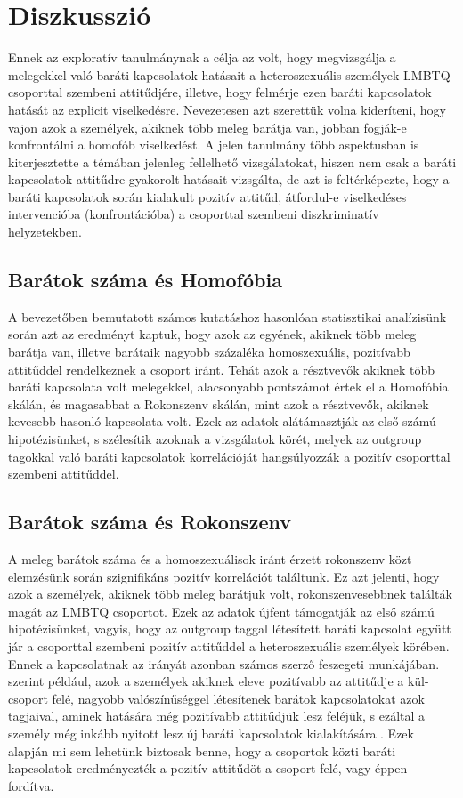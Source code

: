 \section{Diszkusszió}
Ennek az exploratív tanulmánynak a célja az volt, hogy megvizsgálja a melegekkel való baráti kapcsolatok hatásait a heteroszexuális személyek LMBTQ csoporttal szembeni attitűdjére, illetve, hogy felmérje ezen baráti kapcsolatok hatását az explicit viselkedésre. Nevezetesen azt szerettük volna kideríteni, hogy vajon azok a személyek, akiknek több meleg barátja van, jobban fogják-e konfrontálni a homofób viselkedést. A jelen tanulmány több aspektusban is kiterjesztette a témában jelenleg fellelhető vizsgálatokat, hiszen nem csak a baráti kapcsolatok attitűdre gyakorolt hatásait vizsgálta, de azt is feltérképezte, hogy a baráti kapcsolatok során kialakult pozitív attitűd, átfordul-e viselkedéses intervencióba (konfrontációba) a csoporttal szembeni diszkriminatív helyzetekben.

\subsection{Barátok száma és Homofóbia}
A bevezetőben bemutatott számos kutatáshoz hasonlóan \parencite{dasgupta_rivera_2008,pettigrew_1997}  statisztikai analízisünk során azt az eredményt kaptuk, hogy azok az egyének, akiknek több meleg barátja van, illetve barátaik nagyobb százaléka homoszexuális, pozitívabb attitűddel rendelkeznek a csoport iránt.  Tehát azok a résztvevők akiknek több baráti kapcsolata volt melegekkel, alacsonyabb pontszámot értek el a Homofóbia skálán, és magasabbat a Rokonszenv skálán, mint azok a résztvevők, akiknek kevesebb hasonló kapcsolata volt. Ezek az adatok alátá\-masztják az első számú hipotézisünket, s szélesítik azoknak a vizsgálatok körét, melyek az outgroup tagokkal való baráti kapcsolatok korrelációját hangsúlyozzák a pozitív csoporttal szembeni attitűddel. 

\subsection{Barátok száma és Rokonszenv}
A meleg barátok száma és a homoszexuálisok iránt érzett rokonszenv közt elemzésünk során  szignifikáns pozitív korrelációt találtunk. Ez azt jelenti, hogy azok a személyek, akiknek több meleg barátjuk volt, rokonszenvesebbnek találták magát az LMBTQ csoportot. Ezek az adatok újfent támogatják az első számú hipotézisünket, vagyis, hogy az outgroup taggal létesített baráti kapcsolat együtt jár a csoporttal szembeni pozitív attitűddel a heteroszexuális személyek körében. Ennek a kapcsolatnak az irányát azonban számos szerző feszegeti munkájában. \textcite{pettigrew_1997} szerint például, azok a személyek akiknek eleve pozitívabb az attitűdje a kül-csoport felé, nagyobb valószínűséggel létesítenek barátok kapcsolatokat azok tagjaival, aminek hatására még pozitívabb attitűdjük lesz feléjük, s ezáltal a személy még inkább nyitott lesz új baráti kapcsolatok kialakítására \parencite{pettigrew_1997}. Ezek alapján mi sem lehetünk biztosak benne, hogy a csoportok közti baráti kapcsolatok eredményezték a pozitív attitűdöt a csoport felé, vagy éppen fordítva. 


